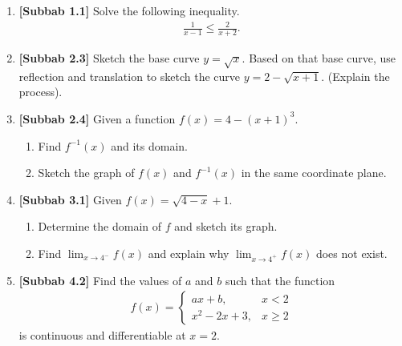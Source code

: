 \documentclass[10pt,openany,a4paper]{article}
\theoremstyle{definition}
\theoremstyle{definition}
\theoremstyle{plain}
\begin{document}
\begin{enumerate}
    \item \textbf{[Subbab 1.1]} Solve the following inequality.
    \begin{align*}
        \frac{1}{x-1}\leq\frac{2}{x+2}.
    \end{align*}

    \item \textbf{[Subbab 2.3]} Sketch the base curve $y=\sqrt{x}$. Based on that base curve, use reflection and translation to sketch the curve $y=2-\sqrt{x+1}$. (Explain the process).

    \item \textbf{[Subbab 2.4]} Given a function $f(x)=4-(x+1)^3$.
    \begin{enumerate}
        \item[a)] Find $f^{-1}(x)$ and its domain.
        \item[b)] Sketch the graph of $f(x)$ and $f^{-1}(x)$ in the same coordinate plane.
    \end{enumerate}

    \item \textbf{[Subbab 3.1]} Given $f(x)=\sqrt{4-x}+1$.
    \begin{enumerate}
        \item[a.] Determine the domain of $f$ and sketch its graph.
        \item[b.] Find $\displaystyle\lim_{x\to 4^-}f(x)$ and explain why $\displaystyle\lim_{x\to 4^+}f(x)$ does not exist.
    \end{enumerate}

    \item \textbf{[Subbab 4.2]} Find the values of $a$ and $b$ such that the function
    \begin{align*}
        f(x)=\begin{cases}
            ax+b, & x<2\\
            x^2-2x+3, & x\geq 2
        \end{cases}
    \end{align*}
    is continuous and differentiable at $x=2$.
\end{enumerate}

\newpage
\end{document}
